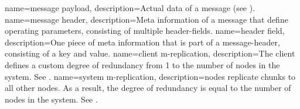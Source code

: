 {
    name={message payload},
    description={Actual data of a \gls{message} (see ).}
}
{
    name={message header},
    description={Meta information of a \gls{message} that define operating parameters, consisting of multiple \glspl{header-field}.}
}
{
    name={header field},
    description={One piece of meta information that is part of a \gls{message-header}, consisting of a key and value.}
}
{
    name={client m-replication},
    description={The \gls{client} defines a custom degree of redundancy from 1 to the number of \glspl{node} in the system. See .}
}
{
    name={system m-replication},
    description={\Glspl{node} replicate \glspl{chunk} to all other \glspl{node}. As a result, the degree of redundancy is equal to the number of \glspl{node} in the system. See .}
}
